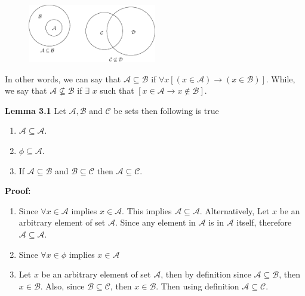 \documentclass[a4paper,10pt]{article}
\begin{document}
\begin{figure}[!h]
\centering
 \includegraphics[height=1.0in]{fig33.eps}
\end{figure}
In other words, we can say that $\mathcal{A}\subseteq \mathcal{B}$ if $\forall x [(x\in \mathcal{A}) \rightarrow (x\in\mathcal{B})]$. While, we say that $\mathcal{A}\nsubseteq\mathcal{B}$ if $\exists$ $x$ such that $[x\in\mathcal{A}\rightarrow x\not\in\mathcal{B}]$.

\textbf{Lemma 3.1} Let $\mathcal{A},\mathcal{B}$ and $\mathcal{C}$ be sets then following is true
\begin{enumerate}
 \item $\mathcal{A}\subseteq \mathcal{A}$.
 \item $\mathcal{\phi}\subseteq\mathcal{A}$.
 \item If $\mathcal{A}\subseteq\mathcal{B}$ and $\mathcal{B}\subseteq\mathcal{C}$ then $\mathcal{A}\subseteq\mathcal{C}$.
\end{enumerate}

\textbf{Proof: }
\begin{enumerate}
 \item Since $\forall x\in\mathcal{A}$ implies $x\in\mathcal{A}$. This implies $\mathcal{A}\subseteq \mathcal{A}$. Alternatively, Let $x$ be an arbitrary element of set $\mathcal{A}$. Since any element in $\mathcal{A}$ is in $\mathcal{A}$ itself, therefore $\mathcal{A}\subseteq \mathcal{A}$.
 \item Since $\forall x \in \mathcal{\phi}$ implies $ x \in \mathcal{A}$
 \item Let $x$ be an arbitrary element of set $\mathcal{A}$, then by definition since $\mathcal{A}\subseteq \mathcal{B}$, then $x\in \mathcal{B}$. Also, since $\mathcal{B}\subseteq\mathcal{C}$, then $x\in \mathcal{B}$. Then using definition $\mathcal{A}\subseteq\mathcal{C}$.
\end{enumerate}
\end{document}
